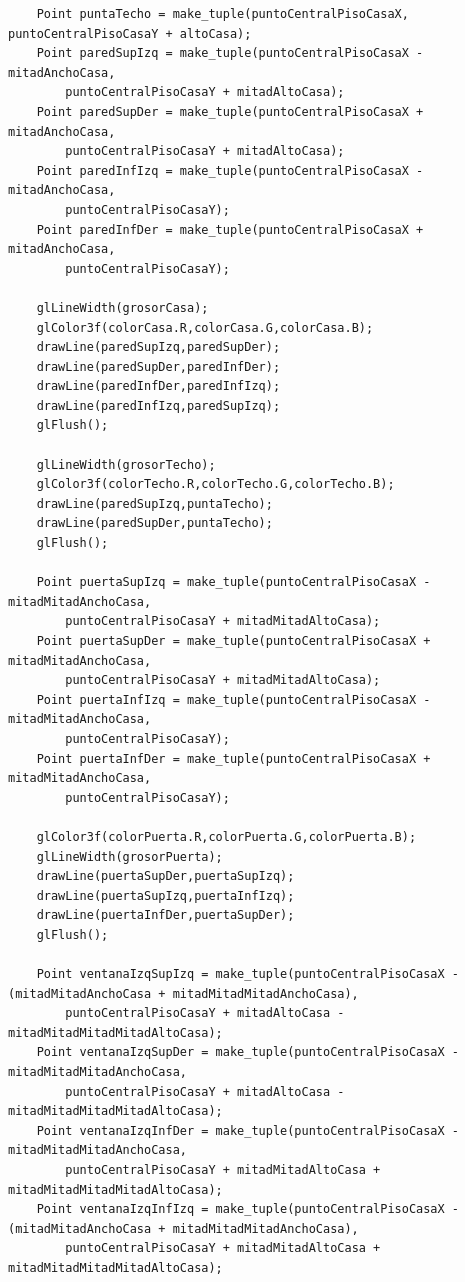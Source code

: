 \documentclass[a4paper,12pt]{article}
\begin{document}
\begin{enumerate}
\begin{lstlisting}
    Point puntaTecho = make_tuple(puntoCentralPisoCasaX, puntoCentralPisoCasaY + altoCasa);
    Point paredSupIzq = make_tuple(puntoCentralPisoCasaX - mitadAnchoCasa,
        puntoCentralPisoCasaY + mitadAltoCasa);
    Point paredSupDer = make_tuple(puntoCentralPisoCasaX + mitadAnchoCasa,
        puntoCentralPisoCasaY + mitadAltoCasa);
    Point paredInfIzq = make_tuple(puntoCentralPisoCasaX - mitadAnchoCasa, 
        puntoCentralPisoCasaY);
    Point paredInfDer = make_tuple(puntoCentralPisoCasaX + mitadAnchoCasa, 
        puntoCentralPisoCasaY);

    glLineWidth(grosorCasa);
    glColor3f(colorCasa.R,colorCasa.G,colorCasa.B);
    drawLine(paredSupIzq,paredSupDer);
    drawLine(paredSupDer,paredInfDer);
    drawLine(paredInfDer,paredInfIzq);
    drawLine(paredInfIzq,paredSupIzq);
    glFlush();

    glLineWidth(grosorTecho);
    glColor3f(colorTecho.R,colorTecho.G,colorTecho.B);
    drawLine(paredSupIzq,puntaTecho);
    drawLine(paredSupDer,puntaTecho);
    glFlush();

    Point puertaSupIzq = make_tuple(puntoCentralPisoCasaX - mitadMitadAnchoCasa,
        puntoCentralPisoCasaY + mitadMitadAltoCasa);
    Point puertaSupDer = make_tuple(puntoCentralPisoCasaX + mitadMitadAnchoCasa,
        puntoCentralPisoCasaY + mitadMitadAltoCasa);
    Point puertaInfIzq = make_tuple(puntoCentralPisoCasaX - mitadMitadAnchoCasa,
        puntoCentralPisoCasaY);
    Point puertaInfDer = make_tuple(puntoCentralPisoCasaX + mitadMitadAnchoCasa,
        puntoCentralPisoCasaY);

    glColor3f(colorPuerta.R,colorPuerta.G,colorPuerta.B);
    glLineWidth(grosorPuerta);
    drawLine(puertaSupDer,puertaSupIzq);
    drawLine(puertaSupIzq,puertaInfIzq);
    drawLine(puertaInfDer,puertaSupDer);
    glFlush();

    Point ventanaIzqSupIzq = make_tuple(puntoCentralPisoCasaX - (mitadMitadAnchoCasa + mitadMitadMitadAnchoCasa),
        puntoCentralPisoCasaY + mitadAltoCasa - mitadMitadMitadMitadAltoCasa);
    Point ventanaIzqSupDer = make_tuple(puntoCentralPisoCasaX - mitadMitadMitadAnchoCasa,
        puntoCentralPisoCasaY + mitadAltoCasa - mitadMitadMitadMitadAltoCasa);
    Point ventanaIzqInfDer = make_tuple(puntoCentralPisoCasaX - mitadMitadMitadAnchoCasa,
        puntoCentralPisoCasaY + mitadMitadAltoCasa + mitadMitadMitadMitadAltoCasa);
    Point ventanaIzqInfIzq = make_tuple(puntoCentralPisoCasaX - (mitadMitadAnchoCasa + mitadMitadMitadAnchoCasa),
        puntoCentralPisoCasaY + mitadMitadAltoCasa + mitadMitadMitadMitadAltoCasa);


\end{lstlisting}
\end{enumerate}
\end{document}
